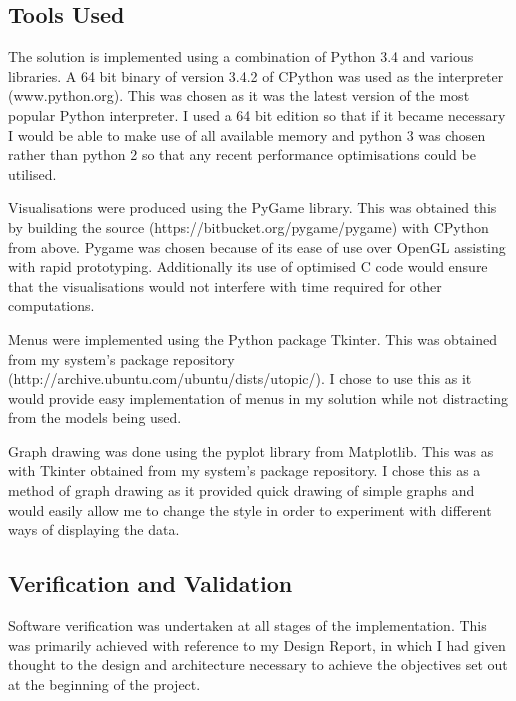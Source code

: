 \documentclass[12pt,a4paper]{article}
\begin{document}

\subsection{Tools Used}
\noindent
The solution is implemented using a combination of Python 3.4 and various libraries. A 64 bit binary of version 3.4.2 of CPython was used as the interpreter (www.python.org). This was chosen as it was the latest version of the most popular Python interpreter. I used a 64 bit edition so that if it became necessary I would be able to make use of all available memory and python 3 was chosen rather than python 2 so that any recent performance optimisations could be utilised.

Visualisations were produced using the PyGame library. This was obtained this by building the source (https://bitbucket.org/pygame/pygame) with CPython from above. Pygame was chosen because of its ease of use over OpenGL assisting with rapid prototyping. Additionally its use of optimised C code would ensure that the visualisations would not interfere with time required for other computations.

Menus were implemented using the Python package Tkinter. This was obtained from my system's package repository (http://archive.ubuntu.com/ubuntu/dists/utopic/). I chose to use this as it would provide easy implementation of menus in my solution while not distracting from the models being used.

Graph drawing was done using the pyplot library from Matplotlib. This was as with Tkinter obtained from my system's package repository. I chose this as a method of graph drawing as it provided quick drawing of simple graphs and would easily allow me to change the style in order to experiment with different ways of displaying the data.

\subsection{Verification and Validation}
\noindent
Software verification was undertaken at all stages of the implementation. This was primarily achieved with reference to my Design Report, in which I had given thought to the design and architecture necessary to achieve the objectives set out at the beginning of the project.
\end{document}
